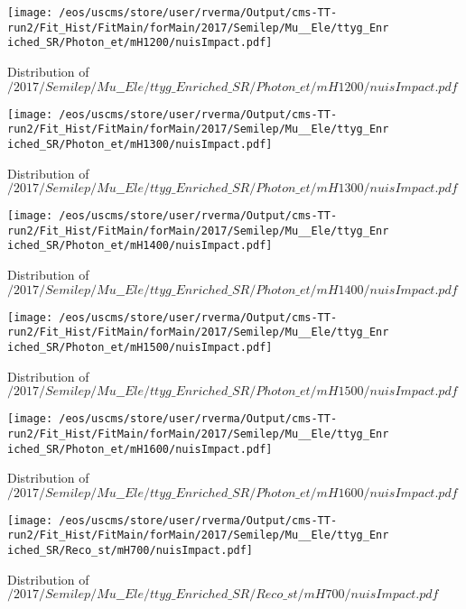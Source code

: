 \begin{figure}
\centering
\texttt{[image: /eos/uscms/store/user/rverma/Output/cms-TT-run2/Fit\_Hist/FitMain/forMain/2017/Semilep/Mu\_\_Ele/ttyg\_Enriched\_SR/Photon\_et/mH1200/nuisImpact.pdf]}
\caption{Distribution of $/2017/Semilep/Mu\_\_Ele/ttyg\_Enriched\_SR/Photon\_et/mH1200/nuisImpact.pdf$}
\end{figure}

\begin{figure}
\centering
\texttt{[image: /eos/uscms/store/user/rverma/Output/cms-TT-run2/Fit\_Hist/FitMain/forMain/2017/Semilep/Mu\_\_Ele/ttyg\_Enriched\_SR/Photon\_et/mH1300/nuisImpact.pdf]}
\caption{Distribution of $/2017/Semilep/Mu\_\_Ele/ttyg\_Enriched\_SR/Photon\_et/mH1300/nuisImpact.pdf$}
\end{figure}

\begin{figure}
\centering
\texttt{[image: /eos/uscms/store/user/rverma/Output/cms-TT-run2/Fit\_Hist/FitMain/forMain/2017/Semilep/Mu\_\_Ele/ttyg\_Enriched\_SR/Photon\_et/mH1400/nuisImpact.pdf]}
\caption{Distribution of $/2017/Semilep/Mu\_\_Ele/ttyg\_Enriched\_SR/Photon\_et/mH1400/nuisImpact.pdf$}
\end{figure}

\begin{figure}
\centering
\texttt{[image: /eos/uscms/store/user/rverma/Output/cms-TT-run2/Fit\_Hist/FitMain/forMain/2017/Semilep/Mu\_\_Ele/ttyg\_Enriched\_SR/Photon\_et/mH1500/nuisImpact.pdf]}
\caption{Distribution of $/2017/Semilep/Mu\_\_Ele/ttyg\_Enriched\_SR/Photon\_et/mH1500/nuisImpact.pdf$}
\end{figure}

\begin{figure}
\centering
\texttt{[image: /eos/uscms/store/user/rverma/Output/cms-TT-run2/Fit\_Hist/FitMain/forMain/2017/Semilep/Mu\_\_Ele/ttyg\_Enriched\_SR/Photon\_et/mH1600/nuisImpact.pdf]}
\caption{Distribution of $/2017/Semilep/Mu\_\_Ele/ttyg\_Enriched\_SR/Photon\_et/mH1600/nuisImpact.pdf$}
\end{figure}

\begin{figure}
\centering
\texttt{[image: /eos/uscms/store/user/rverma/Output/cms-TT-run2/Fit\_Hist/FitMain/forMain/2017/Semilep/Mu\_\_Ele/ttyg\_Enriched\_SR/Reco\_st/mH700/nuisImpact.pdf]}
\caption{Distribution of $/2017/Semilep/Mu\_\_Ele/ttyg\_Enriched\_SR/Reco\_st/mH700/nuisImpact.pdf$}
\end{figure}

